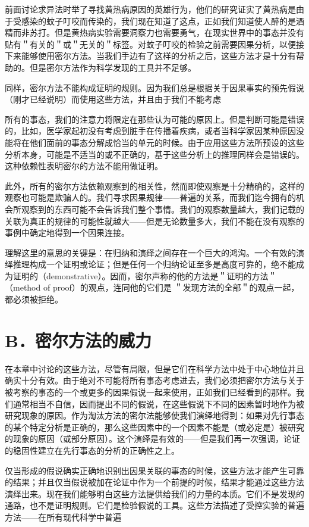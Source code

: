 前面讨论求异法时举了寻找黄热病原因的英雄行为，他们的研究证实了黄热病是由于受感染的蚊子叮咬而传染的，我们现在知道了这点，正如我们知道使人醉的是酒精而非苏打。但是黄热病实验需要洞察力也需要勇气，在现实世界中的事态并没有贴有＂有关的＂或＂无关的＂标签。对蚊子叮咬的检验之前需要因果分析，以便接下来能够使用密尔方法。当我们手边有了这样的分析之后，这些方法才是十分有帮助的。但是密尔方法作为科学发现的工具并不足够。

同样，密尔方法不能构成证明的规则。因为我们总是根据关于因果事实的预先假说（刚才已经说明）而使用这些方法，并且由于我们不能考虑

所有的事态，我们的注意力将限定在那些认为可能的原因上。但是判断可能是错误的，比如，医学家起初没有考虑到脏手在传播着疾病，或者当科学家因某种原因没能将在他们面前的事态分解成恰当的单元的时候。由于应用这些方法所预设的这些分析本身，可能是不适当的或不正确的，基于这些分析上的推理同样会是错误的。这种依赖性表明密尔的方法不能用做证明。

此外，所有的密尔方法依赖观察到的相关性，然而即使观察是十分精确的，这样的观察也可能是欺骗人的。我们寻求因果规律——普遍的关系，而我们迄今拥有的机会所观察到的东西可能不会告诉我们整个事情。我们的观察数量越大，我们记载的关联为真正的规律的可能性就越大——但是无论数量多大，我们不能在没有观察的事例中确定地得到一个因果连接。

理解这里的意思的关键是：在归纳和演绎之间存在一个巨大的鸿沟。一个有效的演绎推理构成一个证明或论证；但是任何一个归纳论证至多是高度可靠的，绝不能成为证明的（demonstrative）。因而，密尔声称的他的方法是＂证明的方法＂（method of proof）的观点，连同他的它们是 ＂发现方法的全部＂的观点一起，都必须被拒绝。

\section*{B．密尔方法的威力}
在本章中讨论的这些方法，尽管有局限，但是它们在科学方法中处于中心地位并且确实十分有效。由于绝对不可能将所有事态考虑进去，我们必须把密尔方法与关于被考察的事态的一个或更多的因果假说一起来使用，正如我们已经看到的那样。我们通常相当不自信，因而提出不同的假说，在这些假说下不同的因素暂时地作为被研究现象的原因。作为淘汰方法的密尔法能够使我们演绎地得到：如果对先行事态的某个特定分析是正确的，那么这些因素中的一个因素不能是（或必定是）被研究的现象的原因（或部分原因）。这个演绎是有效的——但是我们再一次强调，论证的稳固性建立在先行事态的分析的正确性之上。

仅当形成的假说确实正确地识别出因果关联的事态的时候，这些方法才能产生可靠的结果；并且仅当假说被加在论证中作为一个前提的时候，结果才能通过这些方法演绎出来。现在我们能够明白这些方法提供给我们的力量的本质。它们不是发现的通路，也不是证明规则。它们是检验假说的工具。这些方法描述了受控实验的普遍方法——在所有现代科学中普遍

